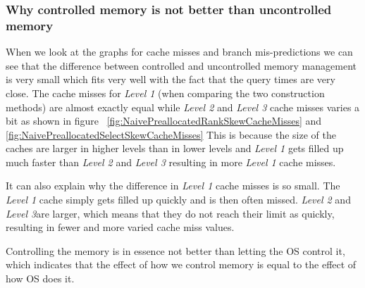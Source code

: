 \subsubsection{Why controlled memory is not better than uncontrolled memory}
When we look at the graphs for cache misses and branch mis-predictions we can see that the difference between controlled and uncontrolled memory management is very small which fits very well with the fact that the query times are very close.
The cache misses for \textit{Level 1} (when comparing the two construction methods) are almost exactly equal while \textit{Level 2} and \textit{Level 3} cache misses varies a bit as shown in figure ~\ref{fig:NaivePreallocatedRankSkewCacheMisses} and \ref{fig:NaivePreallocatedSelectSkewCacheMisses}
This is because the size of the caches are larger in higher levels than in lower levels and \textit{Level 1} gets filled up much faster than \textit{Level 2} and \textit{Level 3} resulting in more \textit{Level 1} cache misses.

It can also explain why the difference in \textit{Level 1} cache misses is so small. 
The \textit{Level 1} cache simply gets filled up quickly and is then often missed. \textit{Level 2} and \textit{Level 3}are larger, which means that they do not reach their limit as quickly, resulting in fewer and more varied cache miss values.



Controlling the memory is in essence not better than letting the OS control it, which indicates that the effect of how we control memory is equal to the effect of how OS does it.







